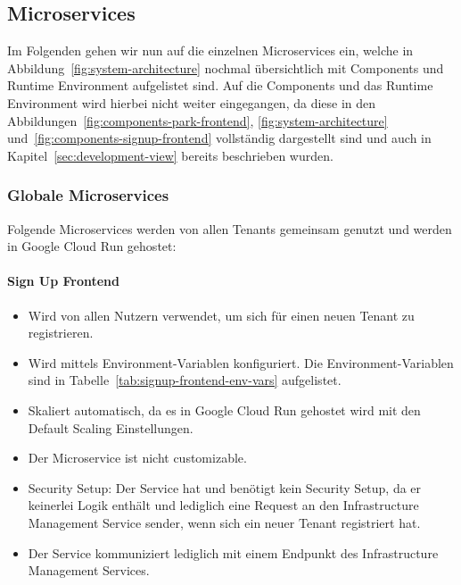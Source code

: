 \subsection{Microservices}
Im Folgenden gehen wir nun auf die einzelnen Microservices ein, welche in Abbildung~\ref{fig:system-architecture} nochmal übersichtlich mit Components und Runtime Environment aufgelistet sind.
Auf die Components und das Runtime Environment wird hierbei nicht weiter eingegangen, da diese in den Abbildungen~\ref{fig:components-park-frontend}, \ref{fig:system-architecture} und~\ref{fig:components-signup-frontend} vollständig dargestellt sind und auch in Kapitel~\ref{sec:development-view} bereits beschrieben wurden.

\subsubsection{Globale Microservices}
Folgende Microservices werden von allen Tenants gemeinsam genutzt und werden in Google Cloud Run gehostet:

\paragraph{Sign Up Frontend}
\label{sec:signup-frontend}
\begin{itemize}
	\item Wird von allen Nutzern verwendet, um sich für einen neuen Tenant zu registrieren.
	\item Wird mittels Environment-Variablen konfiguriert. Die Environment-Variablen sind in Tabelle~\ref{tab:signup-frontend-env-vars} aufgelistet.
	\item Skaliert automatisch, da es in Google Cloud Run gehostet wird mit den Default Scaling Einstellungen.
	\item Der Microservice ist nicht customizable.
	\item Security Setup: Der Service hat und benötigt kein Security Setup, da er keinerlei Logik enthält und lediglich eine Request an den Infrastructure Management Service sender, wenn sich ein neuer Tenant registriert hat.
	\item Der Service kommuniziert lediglich mit einem Endpunkt des Infrastructure Management Services.
\end{itemize}

